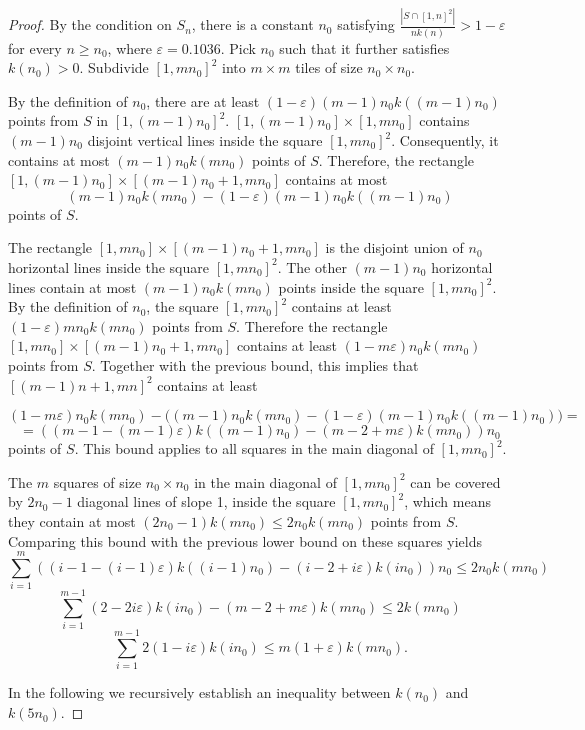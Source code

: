 \documentclass[11pt,a4paper]{article}
\numberwithin{equation}{section}
\begin{document}
\begin{proof}
By the condition on $S_n$, there is a constant $n_0$ satisfying $\frac{|S \cap [1,n]^2|}{n k(n)} >1-\varepsilon$ for every $n \ge n_0$, where $\varepsilon=0.1036$. Pick $n_0$ such that it further satisfies $k(n_0) > 0$. Subdivide $[1, mn_0]^2$ into $m\times m$ tiles of size $n_0\times n_0$. 
 
 By the definition of $n_0$, there are at least $(1-\varepsilon)(m-1)n_0k((m-1)n_0)$ points from $S$ in $[1,(m-1)n_0]^2$. $[1,(m-1)n_0]\times[1,mn_0]$ contains $(m-1)n_0$ disjoint vertical lines inside the  square $[1, mn_0]^2$. Consequently, it contains at most $(m-1)n_0k(mn_0)$ points of $S$.
  Therefore, the rectangle $[1,(m-1)n_0]\times[(m-1)n_0+1,mn_0]$ contains at most $$(m-1)n_0k(mn_0)-(1-\varepsilon)(m-1)n_0k((m-1)n_0)$$ points of $S$.  
  
  The rectangle $[1,mn_0]\times[(m-1)n_0+1,mn_0]$ is the disjoint union of $n_0$ horizontal lines inside the square $[1, mn_0]^2$. The other $(m-1)n_0$ horizontal lines contain at most $(m-1)n_0k(mn_0)$ points inside the square $[1, mn_0]^2$. By the definition of $n_0$, the square $[1, mn_0]^2$ contains at least $(1-\varepsilon)mn_0k(mn_0)$ points from $S$. Therefore the rectangle $[1,mn_0]\times[(m-1)n_0+1,mn_0]$ contains at least $(1-m\varepsilon)n_0k(mn_0)$ points from $S$. Together with the previous bound, this implies that $[(m-1)n+1,mn]^2$ contains at least 

  $$   (1-m\varepsilon)n_0k(mn_0)-\big((m-1)n_0k(mn_0)-(1-\varepsilon)(m-1)n_0k((m-1)n_0)\big)=$$ 
 $$=((m-1-(m-1)\varepsilon)k((m-1)n_0)-(m-2+m\varepsilon)k(mn_0))n_0$$
 points of $S$. This bound applies to all squares in the main diagonal of $[1, mn_0]^2$.

The $m$ squares of size $n_0\times n_0$ in the main diagonal of $[1,mn_0]^2$ can be covered by $2n_0-1$ diagonal lines of slope 1, inside the square $[1,mn_0]^2$, which means they contain at most $(2n_0-1)k(mn_0)\le2n_0k(mn_0)$ points from $S$. Comparing this bound with the previous lower bound on these squares yields 
$$\sum_{i=1}^{m}((i-1-(i-1)\varepsilon)k((i-1)n_0)-(i-2+i\varepsilon)k(in_0))n_0\le2n_0k(mn_0)$$
$$\sum_{i=1}^{m-1}(2-2i\varepsilon)k(in_0)-(m-2+m\varepsilon)k(mn_0)\le 2k(mn_0)$$
\begin{equation}
\sum_{i=1}^{m-1}2(1-i\varepsilon)k(in_0)\le m(1+\varepsilon)k(mn_0).
\label{eq:sum_bound}
\end{equation}

In the following we recursively establish an inequality between $k(n_0)$ and $k(5n_0)$.


\end{proof}
\end{document}
